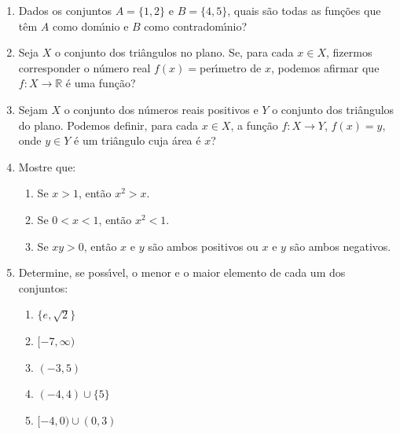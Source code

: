 \documentclass[a4paper,5pt]{amsbook}
\newcommand{\ra}{\rightarrow}
\begin{document}
\vspace{1cm}
\begin{enumerate}
    \setlength\itemsep{0.5cm}
    \item Dados os conjuntos $A=\{1,2\}$ e $B=\{4,5\}$, quais s\~ao todas as
    fun\c{c}\~oes que t\^em $A$ como dom\'{\i}nio e $B$ como contradom\'{\i}nio?

    \item Seja $X$ o conjunto dos tri\^angulos no plano. Se, para cada $x\in X$,
    fizermos corresponder o n\'umero real $f(x)=$per\'{\i}metro de $x$, podemos
    afirmar que $f:X\ra \mathbb{R}$ \'e uma fun\c{c}\~ao?

    \item Sejam $X$ o conjunto dos n\'umeros reais positivos e $Y$ o conjunto dos
    tri\^angulos do plano. Podemos definir, para cada $x\in X$, a fun\c{c}\~ao $f:X\ra
    Y$, $f(x)=y$, onde $y\in Y$ \'e um tri\^angulo cuja \'area \'e $x$?

    \item Mostre que:
        \begin{enumerate}
            \setlength\itemsep{0.2cm}
            \item Se $x>1$, ent\~ao $x^2>x$.
            \item Se $0<x<1$, ent\~ao $x^2<1$.
            \item Se $xy>0$, ent\~ao $x$ e $y$ s\~ao ambos positivos ou $x$ e $y$
            s\~ao ambos negativos.
        \end{enumerate}

    \item Determine, se poss\'{\i}vel, o menor e o maior elemento de cada um dos
    conjuntos:
        \begin{enumerate}
            \setlength\itemsep{0.2cm}
            \item $\{e,\sqrt{2}\}$
            \item $[-7, \infty)$
            \item $(-3,5)$
            \item $(-4,4)\cup\{5\}$
            \item $[-4,0)\cup(0,3)$
        \end{enumerate}
\end{enumerate}
\end{document}
